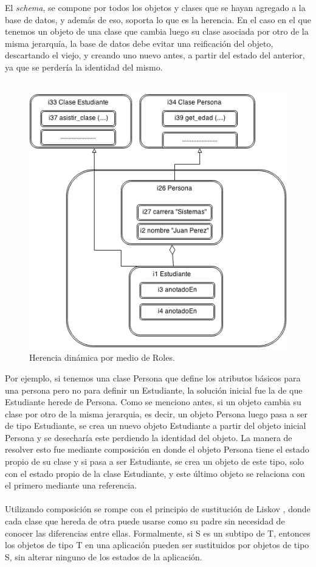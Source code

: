 \documentclass{melta}
\begin{document}
El \textit{schema}, se compone por todos los objetos y clases que se hayan agregado a la base de datos, y además de eso, soporta lo que es la herencia. En el caso en el que tenemos un objeto de una clase que cambia luego su clase asociada por otro de la misma jerarquía, la base de datos debe evitar una reificación del objeto, descartando el viejo, y creando uno nuevo antes, a partir del estado del anterior, ya que se perdería la identidad del mismo. 
\\\\
\begin{figure}
\centering
\includegraphics[scale=0.43]{MeltaHerenciaDinamica}
\caption{Herencia dinámica por medio de Roles.}
\label{melta:herenciaDinamica}
\end{figure}

Por ejemplo, si tenemos una clase Persona que define los atributos básicos para una persona pero no para definir un Estudiante, la solución inicial fue la de que Estudiante herede de Persona. Como se menciono antes, si un objeto cambia su clase por otro de la misma jerarquia, es decir, un objeto Persona luego pasa a ser de tipo Estudiante, se crea un nuevo objeto Estudiante a partir del objeto inicial Persona y se desecharía este perdiendo la identidad del objeto. La manera de resolver esto fue mediante composición en donde el objeto Persona tiene el estado propio de su clase y si pasa a ser Estudiante, se crea un objeto de este tipo, solo con el estado propio de la clase Estudiante, y este último objeto se relaciona con el primero mediante una referencia.
\\\\
Utilizando composición se rompe con el principio de sustitución de Liskov \cite{sub:Liskov}, donde cada clase que hereda de otra puede usarse como su padre sin necesidad de conocer las diferencias entre ellas. Formalmente, si S es un subtipo de T, entonces los objetos de tipo T en una aplicación pueden ser sustituidos por objetos de tipo S, sin alterar ninguno de los estados de la aplicación. 
\end{document}
